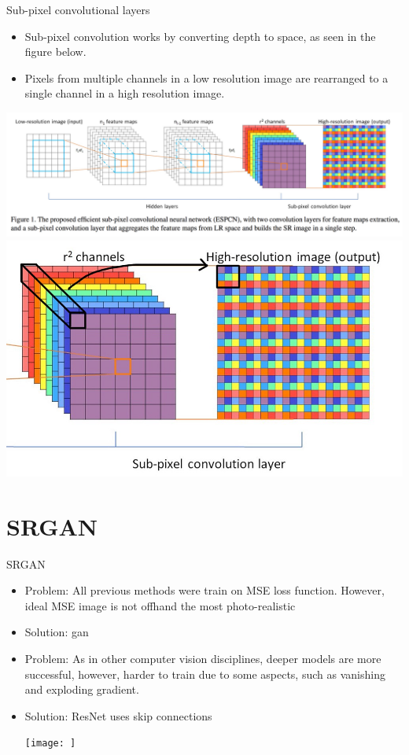 \documentclass[hyperref={unicode}, xcolor=dvipsnames, t]{beamer}
\begin{document}
\begin{frame}{Sub-pixel convolutional layers}
    \begin{itemize}
        \item Sub-pixel convolution works by converting depth to space, as seen in the figure below. 
        \item Pixels from multiple channels in a low resolution image are rearranged to a single channel in a high resolution image. 
    \end{itemize}
    \begin{center}
     {
        \includegraphics[width=\linewidth]{figures/sub-pixel.png}
    }
     {
        \includegraphics[width=0.8\linewidth]{figures/sub-pixel-detail.jpeg}
    }
    \end{center}
\end{frame}

\section{SRGAN}
\begin{frame}{SRGAN}
    \begin{itemize}
        \item Problem: All previous methods were train on MSE loss function. However, ideal MSE image is not offhand the most photo-realistic
        \item Solution: \gls{gan}
        \newline
        \item Problem: As in other computer vision disciplines, deeper models are more successful, however, harder to train due to some aspects, such as vanishing and exploding gradient.
        \item Solution: ResNet uses skip connections
        \begin{center}
            \texttt{[image: ]}
        \end{center}
        
    \end{itemize}
\end{frame}
\end{document}
